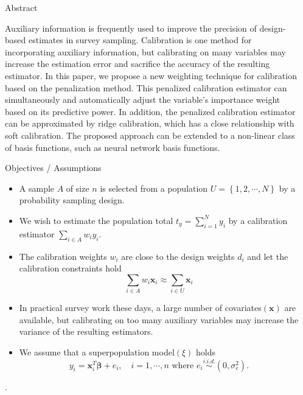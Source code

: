 \documentclass[final]{beamer}
\newlength{\sepwidth}
\newlength{\colwidth}
\newcommand{\separatorcolumn}{\begin{column}{\sepwidth}\end{column}}
\renewcommand{\bf}[1]{\boldsymbol{\mathbf{#1}}}
\newcommand{\set}[1]{\left\{#1\right\}} %
\newcommand{\iid}{\stackrel{i.i.d.}{\sim}}
\begin{document}
\begin{frame}[t]
\begin{columns}[t]
\separatorcolumn

\begin{column}{\colwidth}

  \begin{block}{Abstract}

    Auxiliary information is frequently used to improve the precision of design-based estimates in survey sampling. Calibration is one method for incorporating auxiliary information, but calibrating on many variables may increase the estimation error and sacrifice the accuracy of the resulting estimator. In this paper, we propose a new weighting technique for calibration based on the penalization method. This penalized calibration estimator can simultaneously and automatically adjust the variable's importance weight based on its predictive power. In addition, the penalized calibration estimator can be approximated by ridge calibration, which has a close relationship with soft calibration. The proposed approach can be extended to a non-linear class of basis functions, such as neural network basis functions.

  \end{block}

  \begin{block}{Objectives / Assumptions}
    \begin{itemize}
    \item A sample $A$ of size $n$ is selected from a population $U = \set{1, 2, \cdots, N}$ by a probability sampling design. 
    \item We wish to estimate the population total $t_y = \sum_{i = 1}^N y_i$ by a calibration estimator $\sum_{i \in A}w_i y_i$.
    \item The calibration weights $w_i$ are close to the design weights $d_i$ and let the calibration constraints hold
    $$
    \sum_{i \in A} w_i \bf x_i \approx \sum_{i \in U} \bf x_i
    $$
    \item In practical survey work these days, a large number of covariates$(\bf x)$ are available, but calibrating on too many auxiliary variables may increase the variance of the resulting estimators.
    \item We assume that a superpopulation model$(\xi)$ holds
    \begin{equation}
        y_i = \bf x_i^T \bf \beta + e_i, \quad i = 1, \cdots, n \text{ where $e_i \iid (0, \sigma_e^2)$.}
    \end{equation}
    \end{itemize}.
  \end{block}


\end{column}
\end{columns}
\end{frame}
\end{document}
